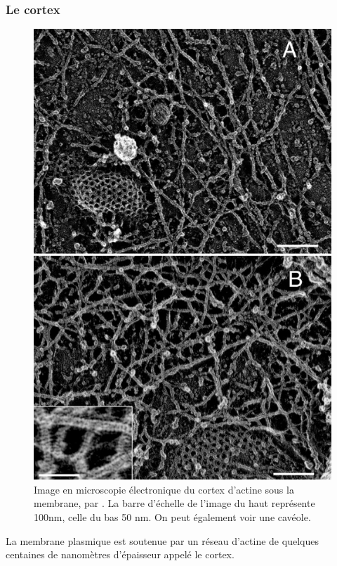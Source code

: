\subsubsection{Le cortex}

\begin{figure}
\includegraphics[scale=0.25]{Figures/cortex.png} 
\caption{Image en microscopie électronique du cortex d'actine sous la membrane, par \cite{morone_three-dimensional_2006}. La barre d'échelle de l'image du haut représente 100nm, celle du bas 50 nm. On peut également voir une cavéole.}
\end{figure}

La membrane plasmique est soutenue par un réseau d'actine de quelques centaines de nanomètres d'épaisseur appelé le cortex.

